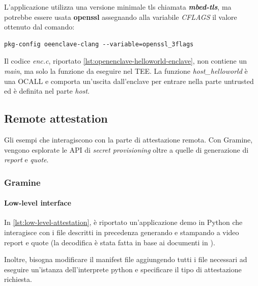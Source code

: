 \documentclass{article}
\begin{document}
L'applicazione utilizza una versione minimale tls chiamata \textbf{\textit{mbed-tls}}, ma potrebbe essere usata \textbf{openssl} assegnando alla variabile \textit{CFLAGS} il valore ottenuto dal comando:

\begin{verbatim}
pkg-config oeenclave-clang --variable=openssl_3flags 
\end{verbatim}



Il codice \textit{enc.c}, riportato \cref{lst:openenclave-helloworld-enclave}, non contiene un \textit{main}, ma solo la funzione da eseguire nel TEE. La funzione \textit{host\_helloworld} è una OCALL e comporta un'uscita dall'enclave per entrare nella parte untrusted ed è definita nel parte \textit{host}.



\subsection{Remote attestation}
Gli esempi che interagiscono con la parte di attestazione remota. Con Gramine, vengono esplorate le API di \textit{secret provisioning} oltre a quelle di generazione di \textit{report} e \textit{quote}.

\subsubsection{Gramine}
\paragraph{Low-level interface}
In \cref{lst:low-level-attestation}, è riportato un'applicazione demo in Python che interagisce con i file descritti in precedenza generando e stampando a video report e quote (la decodifica è stata fatta in base ai documenti in \cite{IntelSDK}). 



Inoltre, bisogna modificare il manifest file aggiungendo tutti i file necessari ad eseguire un'istanza dell'interprete python e specificare il tipo di attestazione richiesta.
\end{document}

